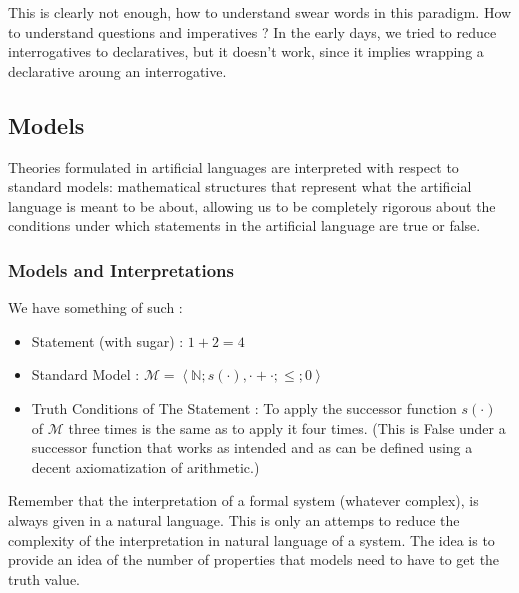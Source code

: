 \documentclass{cours}
\begin{document}
This is clearly not enough, how to understand swear words in this paradigm. How to understand questions and imperatives ? In the early days, we tried to reduce interrogatives to declaratives, but it doesn't work, since it implies wrapping a declarative aroung an interrogative.

\subsection{Models}
Theories formulated in artificial languages are interpreted with respect to standard models\!: mathematical structures that represent what the artificial language is meant to be about, allowing us to be completely rigorous about the conditions under which statements in the artificial language are true or false.
\subsubsection{Models and Interpretations}
We have something of such\! :
\begin{itemize}
    \item Statement (with sugar)\! : $1 + 2 = 4$
    \item Standard Model\! : $\mathcal{M} = \left\langle\mathbb{N}; s(\cdot), \cdot + \cdot;\leq;0\right\rangle$
    \item Truth Conditions of The Statement\! : To apply the successor function $s(\cdot)$ of $\mathcal{M}$ three times is the same as to apply it four times. (This is \textmd{False} under a successor function that works as intended and as can be defined using a decent axiomatization of arithmetic.)
\end{itemize}
Remember that the interpretation of a formal system (whatever complex), is always given in a natural language. This is only an attemps to reduce the complexity of the interpretation in natural language of a system. The idea is to provide an idea of the number of properties that models need to have to get the truth value.
\end{document}
